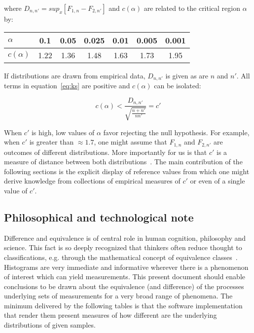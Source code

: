 \documentclass[%
	aip,
	jmp,%
	amsmath,amssymb,
	reprint,%
]{revtex4-1}
\begin{document}
\noindent where $D_{n,n'}=sup_x[F_{1,n}-F_{2,n'}]$ and $c(\alpha)$ are related to the critical region $\alpha$ by:

\begin{table}[h!]
\centering
\begin{tabular}{|l||c|c|c|c|c|c|}\hline
$\alpha$    & 0.1  & 0.05 & 0.025 & 0.01 & 0.005 & 0.001 \\\hline
$c(\alpha)$ & 1.22 & 1.36 & 1.48  & 1.63 & 1.73  & 1.95  \\\hline
\end{tabular}
\end{table}

If distributions are drawn from empirical data, $D_{n,n'}$ is given as are $n$ and $n'$.
All terms in equation~\ref{eq:ks} are positive and $c(\alpha)$ can be isolated:

\begin{equation}\label{eq:ks2}
c(\alpha) < \frac{D_{n,n'}}{\sqrt{\frac{n+n'}{nn'}}} = c'
\end{equation}

When $c'$ is high, low values of $\alpha$ favor rejecting the null hypothesis.
For example, when $c'$ is greater than $\approx 1.7$,
one might assume that $F_{1,n}$ and $F_{2,n'}$
are outcomes of different distributions.
More importantly for us is that $c'$
is a measure of distance between both distributions~\cite{kolm}.
The main contribution of the following sections is the
explicit display of reference values from which
one might derive knowledge from collections of empirical measures of $c'$
or even of a single value of $c'$.

\subsection{Philosophical and technological note}
Difference and equivalence is of central role in human cognition,
philosophy and science.
This fact is so deeply recognized that thinkers often reduce
thought to classifications, e.g. through the
mathematical concept of equivalence classes~\cite{deleuze,physics}.
Histograms are very immediate and informative
wherever there is a phenomenon of interest which can yield measurements.
This present document should enable conclusions to be drawn about 
the equivalence (and difference)
of the processes underlying sets of measurements for a very
broad range of phenomena.
The minimum delivered by the following tables 
is that the software implementation
that render them present measures
of how different are the underlying distributions
of given samples.
\end{document}
